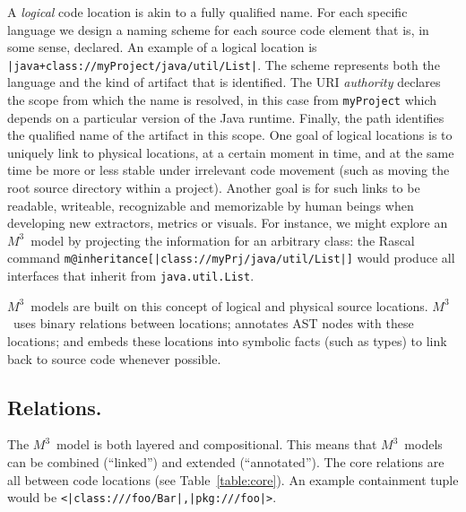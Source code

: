 \documentclass[conference]{IEEEtran}
\newcommand{\loc}[1]{\small{\texttt{#1}}\xspace}
\newcommand{\mthree}{\ensuremath{M^3}\xspace}
\begin{document}
A \emph{logical} code location is akin to a fully qualified name. For each
specific language we design a naming scheme for each source code element that
is, in some sense, declared. An example of a logical location is
\loc{|java+class://myProject/java/util/List|}. The scheme represents both the
language and the kind of artifact that is identified. The URI
\textit{authority} declares the scope from which the name is resolved, in this
case from \texttt{myProject} which depends on a particular version of the Java
runtime. Finally, the path identifies the qualified name of the artifact in
this scope. One goal of logical locations is to uniquely link to physical
locations, at a certain moment in time, and at the same time be more or less
stable under irrelevant code movement (such as moving the root source
directory within a project). Another goal is for such links to be readable,
writeable, recognizable and memorizable by human beings when developing new
extractors, metrics or visuals. For instance, we might explore an \mthree\
model by projecting the information for an arbitrary class: the Rascal command
\texttt{m@inheritance[|class://myPrj/java/util/List|]} would produce all
interfaces that inherit from \verb|java.util.List|.


\mthree\ models are built on this concept of logical and physical source
locations. \mthree\ uses binary relations between locations; annotates AST nodes
with these locations; and embeds these locations into symbolic facts (such
as types) to link back to source code whenever possible.

\subsection{Relations.} The \mthree\  model is both layered and compositional.
This means that \mthree\ models can be combined (``linked'') and extended
(``annotated''). The core relations are all between code locations (see
Table~\ref{table:core}). An example containment tuple would be
\loc{<|class:///foo/Bar|,|pkg:///foo|>}.
\end{document}
